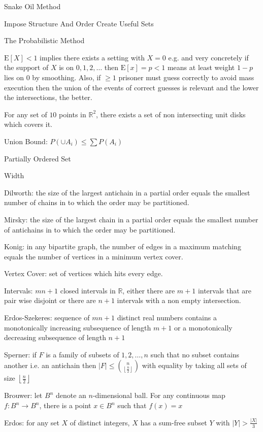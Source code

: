Snake Oil Method

Impose Structure And Order Create Useful Sets

The Probabilistic Method

$\text{E}[X]<1$ implies there exists a setting with $X=0$ e.g. and very concretely if the support of $X$ is on $0,1,2,\dots$ then $\text{E}[x]=p<1$ means at least weight $1-p$ lies on $0$ by smoothing. Also, if $\ge 1$ prisoner must guess correctly to avoid mass execution then the union of the events of correct guesses is relevant and the lower the intersections, the better.

For any set of $10$ points in $\mathbb{R}^2$, there exists a set of non intersecting unit disks which covers it.

Union Bound: $P(\cup A_i) \le \sum P(A_i)$

Partially Ordered Set

Width

Dilworth: the size of the largest antichain in a partial order equals the smallest number of chains in to which the order may be partitioned.

Mirsky: the size of the largest chain in a partial order equals the smallest number of antichains in to which the order may be partitioned.

Konig: in any bipartite graph, the number of edges in a maximum matching equals the number of vertices in a minimum vertex cover.

Vertex Cover: set of vertices which hits every edge.

Intervals: $mn+1$ closed intervals in $\mathbb{R}$, either there are $m+1$ intervals that are pair wise disjoint or there are $n+1$ intervals with a non empty intersection.

Erdos-Szekeres: sequence of $mn+1$ distinct real numbers contains a monotonically increasing subsequence of length $m+1$ or a monotonically decreasing subsequence of length $n+1$

Sperner: if $F$ is a family of subsets of ${1,2,\dots,n}$ such that no subset contains another i.e. an antichain then $|F| \le \binom{n}{\left \lfloor \frac{n}{2} \right \rfloor}$ with equality by taking all sets of size $\left \lfloor \frac{n}{2} \right \rfloor$

Brouwer: let $B^n$ denote an $n$-dimensional ball. For any continuous map $f: B^n \to B^n$, there is a point $x \in B^n$ such that $f(x)=x$

Erdos: for any set $X$ of distinct integers, $X$ has a sum-free subset $Y$ with $|Y| > \frac{|X|}{3}$

